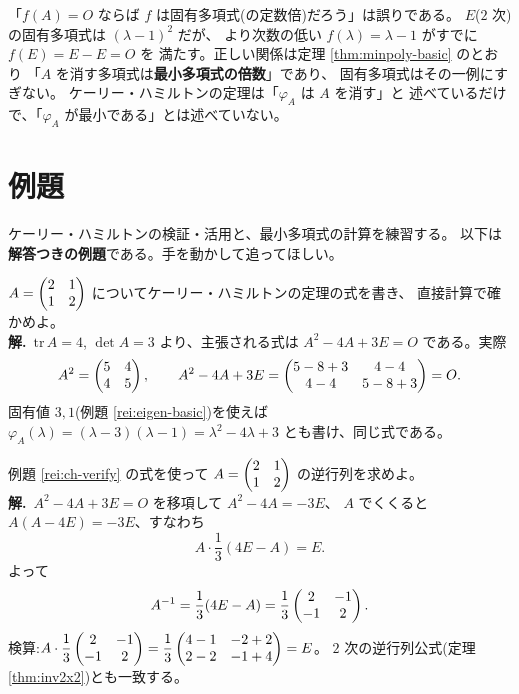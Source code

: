 \begin{hanrei}[$A$ を消す多項式が固有多項式とは限らない]\label{hanrei:ch-annihilator}
「$f(A) = O$ ならば $f$ は固有多項式(の定数倍)だろう」は誤りである。
$E$($2$ 次)の固有多項式は $(\lambda - 1)^2$ だが、
より次数の低い $f(\lambda) = \lambda - 1$ がすでに $f(E) = E - E = O$ を
満たす。正しい関係は定理 \ref{thm:minpoly-basic} のとおり
「$A$ を消す多項式は\textbf{最小多項式の倍数}」であり、
固有多項式はその一例にすぎない。
ケーリー・ハミルトンの定理は「$\varphi_A$ は $A$ を消す」と
述べているだけで、「$\varphi_A$ が最小である」とは述べていない。
\end{hanrei}

\section{例題}

ケーリー・ハミルトンの検証・活用と、最小多項式の計算を練習する。
以下は\textbf{解答つきの例題}である。手を動かして追ってほしい。

\begin{rei}[例題・基本(定理の検証)]\label{rei:ch-verify}
$A = \begin{pmatrix}2 & 1 \\ 1 & 2\end{pmatrix}$ についてケーリー・ハミルトンの定理の式を書き、
直接計算で確かめよ。\\
\textbf{解.}\ $\mathrm{tr}\,A = 4$, $\det A = 3$ より、主張される式は
$A^2 - 4A + 3E = O$ である。実際
\[
A^2 = \begin{pmatrix}5 & 4 \\ 4 & 5\end{pmatrix}, \qquad
A^2 - 4A + 3E = \begin{pmatrix}5 - 8 + 3 & 4 - 4 \\ 4 - 4 & 5 - 8 + 3\end{pmatrix} = O.
\]
固有値 $3, 1$(例題 \ref{rei:eigen-basic})を使えば
$\varphi_A(\lambda) = (\lambda - 3)(\lambda - 1) = \lambda^2 - 4\lambda + 3$
とも書け、同じ式である。
\end{rei}

\begin{rei}[例題・基本(逆行列の計算)]\label{rei:ch-inverse}
例題 \ref{rei:ch-verify} の式を使って
$A = \begin{pmatrix}2 & 1 \\ 1 & 2\end{pmatrix}$ の逆行列を求めよ。\\
\textbf{解.}\ $A^2 - 4A + 3E = O$ を移項して $A^2 - 4A = -3E$、
$A$ でくくると $A(A - 4E) = -3E$、すなわち
\[
A \cdot \frac{1}{3}(4E - A) = E.
\]
よって
\[
A^{-1} = \frac{1}{3}(4E - A) = \frac{1}{3}\begin{pmatrix}2 & -1 \\ -1 & 2\end{pmatrix}.
\]
検算:$A \cdot \dfrac{1}{3}\begin{pmatrix}2 & -1 \\ -1 & 2\end{pmatrix}
= \dfrac{1}{3}\begin{pmatrix}4 - 1 & -2 + 2 \\ 2 - 2 & -1 + 4\end{pmatrix} = E$。
$2$ 次の逆行列公式(定理 \ref{thm:inv2x2})とも一致する。
\end{rei}

